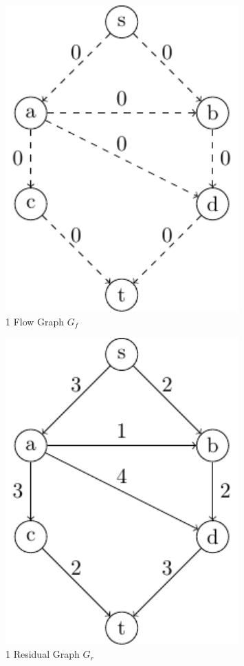 \begin{minipage}{0.2\textwidth}
\begin{figure}[H]
  \centering
  \includegraphics[width=0.8\textwidth]{Figure/maxflow_d1_2.pdf}
  \caption*{1 Flow Graph \(G_f\)}
\end{figure}
\end{minipage}
\begin{minipage}{0.2\textwidth}
\begin{figure}[H]
  \centering
  \includegraphics[width=0.8\textwidth]{Figure/maxflow_d1_3.pdf}
  \caption*{1 Residual Graph \(G_r\)}
\end{figure}
\end{minipage}
